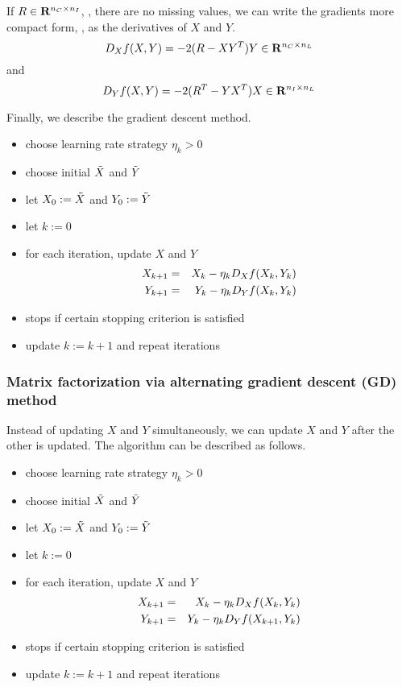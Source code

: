 If $R\in\mathbf{R}^{{n_C} \times {n_I}}$,
\ie, there are no missing values,
we can write the gradients more compact form,
\ie, as the derivatives of $X$ and $Y$.
\begin{equation}
\label{eq:mat-fac-sq-deriv-x}
D_X f(X,Y) = -2 (R-XY^T) Y
\in\mathbf{R}^{{n_C}\times{n_L}}
\end{equation}
and
\begin{equation}
\label{eq:mat-fac-sq-deriv-x}
D_Y f(X,Y) = -2 (R^T-YX^T) X
\in\mathbf{R}^{{n_I}\times{n_L}}
\end{equation}


Finally, we describe the gradient descent method.

\begin{itemize}
\item choose learning rate strategy $\eta_k>0$
\item choose initial $\tilde{X}$ and $\tilde{Y}$
\item let ${{X}_{0}}:=\tilde{X}$ and ${{Y}_{0}}:=\tilde{Y}$
\item let $k:=0$
\item for each iteration, update $X$ and $Y$
\begin{eqnarray}
    {{X}_{k+1}} &=& {{X}_{k}} - \eta_k D_X f({{X}_{k}},{{Y}_{k}})
\\
\label{eq:btai}
    {{Y}_{k+1}} &=& {{Y}_{k}} - \eta_k D_Y f({{X}_{k}},{{Y}_{k}})
\end{eqnarray}
\item stops if certain stopping criterion is satisfied
\item update $k:=k+1$ and repeat iterations
\end{itemize}

\subsubsection{Matrix factorization via alternating gradient descent (GD) method}

Instead of updating $X$ and $Y$ simultaneously,
we can update $X$ and $Y$ after the other is updated.
The algorithm can be described as follows.

\begin{itemize}
\item choose learning rate strategy $\eta_k>0$
\item choose initial $\tilde{X}$ and $\tilde{Y}$
\item let ${{X}_{0}}:=\tilde{X}$ and ${{Y}_{0}}:=\tilde{Y}$
\item let $k:=0$
\item for each iteration, update $X$ and $Y$
\begin{eqnarray}
    {{X}_{k+1}} &=& {{X}_{k}} - \eta_k D_X f({{X}_{k}},{{Y}_{k}})
\\
\label{eq:bhio}
    {{Y}_{k+1}} &=& {{Y}_{k}} - \eta_k D_Y f({{X}_{k+1}},{{Y}_{k}})
\end{eqnarray}
\item stops if certain stopping criterion is satisfied
\item update $k:=k+1$ and repeat iterations
\end{itemize}


